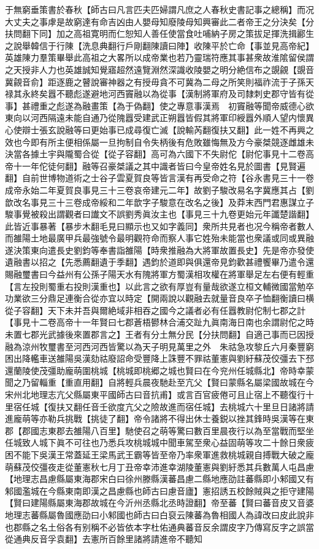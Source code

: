 于無窮垂策書於春秋【師古曰凡言匹夫匹婦謂凡庶之人春秋史書記事之總稱】而况大丈夫之事虖是故窮達有命吉凶由人嬰母知廢陵母知興審此二者帝王之分決矣【分扶問翻下同】加之高祖寛明而仁恕知人善任使當食吐哺納子房之策拔足揮洗揖酈生之說舉韓信于行陳【洗息典翻行戶剛翻陳讀曰陣】收陳平於亡命【事並見高帝紀】英雄陳力羣策畢舉此高祖之大畧所以成帝業也若乃靈瑞符應其事甚衆故淮隂留侯謂之天授非人力也英雄誠知覺寤超然遠覽淵然深識收陵嬰之明分絶信布之覬覦【覬音冀覦音俞】距逐鹿之瞽說審神器之有授毋貪不可冀為二母之所笑則福祚流于子孫天禄其永終矣囂不聽彪遂避地河西竇融以為從事【漢制將軍府及司隸刺史郡守皆有從事】甚禮重之彪遂為融畫策【為于偽翻】使之專意事漢焉　初竇融等聞帝威德心欲東向以河西隔遠未能自通乃從隗囂受建武正朔囂皆假其將軍印綬囂外順人望内懷異心使辯士張玄說融等曰更始事已成尋復亡滅【說輸芮翻復扶又翻】此一姓不再興之效也今即有所主便相係屬一旦拘制自令失柄後有危敗雖悔無及方今豪桀競逐雌雄未決當各據土宇與隴蜀合從【從子容翻】高可為六國下不失尉佗【尉佗事見十二卷高帝十一年佗徒何翻】融等召豪桀議之其中識者皆曰今皇帝姓名見於圖書【見賢遍翻】自前世博物道術之士谷子雲夏賀良等皆言漢有再受命之符【谷永書見三十一卷成帝永始二年夏賀良事見三十三卷哀帝建元二年】故劉子駿改易名字冀應其占【劉歆改名事見三十三卷成帝綏和二年歆字子駿意在改名之後】及莽末西門君惠謀立子駿事覺被殺出謂觀者曰䜟文不誤劉秀眞汝主也【事見三十九卷更始元年讖楚諧翻】此皆近事暴著【暴步木翻毛見曰顯示也又如字義同】衆所共見者也况今稱帝者數人而雒陽土地最廣甲兵最強號令最明觀符命而察人事它姓殆未能當也衆議或同或異融遂決策東向遣長史劉鈞等奉書詣雒陽【時衆推融為大將軍故置長史】先是帝亦發使遺融書以招之【先悉薦翻遺于季翻】遇鈞於道即與俱還帝見鈞歡甚禮饗畢乃遣令還賜融璽書曰今益州有公孫子陽天水有隗將軍方蜀漢相攻權在將軍舉足左右便有輕重【言左投則蜀重右投則漢重也】以此言之欲有厚豈有量哉欲遂立桓文輔微國當勉卒功業欲三分鼎足連衡合從亦宜以時定【開兩說以觀融去就量音良卒子恤翻衡讀曰横從子容翻】天下未并吾與爾絶域非相吞之國今之議者必有任囂教尉佗制七郡之計【事見十二卷高帝十一年賢曰七郡蒼梧鬰林合浦交趾九眞南海日南也余謂尉佗之時未置七郡光武據後來置郡言之】王者有分土無分民【分扶問翻】自適己事而已因授融為涼州牧璽書至河西河西皆驚以為天子明見萬里之外　朱祜急攻黎丘六月秦豐窮困出降轞車送雒陽吳漢劾祜廢詔命受豐降上誅豐不罪祜董憲與劉紆蘇茂佼彊去下邳還蘭陵使茂彊助龐萌圍桃城【桃城即桃郷之城也賢曰在今兖州任城縣北】帝時幸蒙聞之乃留輜重【重直用翻】自將輕兵晨夜馳赴至亢父【賢曰蒙縣名屬梁國故城在今宋州北地理志亢父縣屬東平國師古曰音抗甫】或言百官疲倦可且止宿上不聽復行十里宿任城【復扶又翻任音壬欲度亢父之險故進而宿任城】去桃城六十里旦日諸將請進龐萌等亦勒兵挑戰【挑徒了翻】帝令諸將不得出休士養鋭以挫其鋒時吳漢等在東郡【郡國志東郡去雒陽八百里】馳使召之萌等驚曰數百里晨夜行以為至當戰而堅坐任城致人城下眞不可往也乃悉兵攻桃城城中聞車駕至衆心益固萌等攻二十餘日衆疲困不能下吳漢王常蓋延王梁馬武王霸等皆至帝乃率衆軍進救桃城親自搏戰大破之龐萌蘇茂佼彊夜走從董憲秋七月丁丑帝幸沛進幸湖陵董憲與劉紆悉其兵數萬人屯昌慮【地理志昌慮縣屬東海郡宋白曰徐州滕縣漢蕃昌慮二縣地應劭註蕃縣即小邾國又有邾國濫城在今縣東南即漢之昌慮縣也師古曰慮音廬】憲招誘五校餘賊與之拒守建陽【賢曰建陽縣屬東海郡故城在今沂州丞縣北丞時證翻】帝至蕃【賢曰蕃音皮又音婆地理志蕃縣屬魯國應劭曰小邾國也師古曰白裒云陳蕃為魯相國人為諱改曰皮此說非也郡縣之名土俗各有别稱不必皆依本字杜佑通典蕃音反余謂皮字乃傳寫反字之誤當從通典反音孚袁翻】去憲所百餘里諸將請進帝不聽知